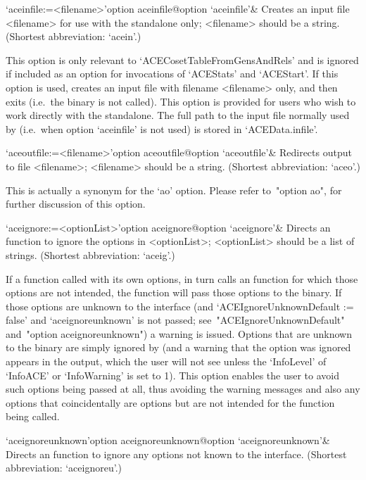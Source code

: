 \>`aceinfile:=<filename>'{option aceinfile}@{option `aceinfile'}&
Creates an {\ACE} input file <filename> for use  with  the  standalone
only; <filename> should be a string. (Shortest abbreviation: `acein'.)

This option is only relevant to `ACECosetTableFromGensAndRels' and  is
ignored if included as an option for  invocations  of  `ACEStats'  and
`ACEStart'. If this option is used, {\GAP} creates an input file  with
filename <filename> only, and then exits (i.e.~the  {\ACE}  binary  is
not called). This option is  provided  for  users  who  wish  to  work
directly with the {\ACE} standalone. The full path to the  input  file
normally used by {\ACE} (i.e.~when option `aceinfile' is not used)  is
stored in `ACEData.infile'.


\>`aceoutfile:=<filename>'{option aceoutfile}@{option `aceoutfile'}&
Redirects {\ACE} output to file <filename>;  <filename>  should  be  a
string. (Shortest abbreviation: `aceo'.)

This  is  actually  a  synonym  for  the  `ao'  option.  Please  refer
to~"option ao", for further discussion of this option.

\>`aceignore:=<optionList>'{option aceignore}@{option `aceignore'}&
Directs an {\ACE} function to  ignore  the  options  in  <optionList>;
<optionList> should be a list of strings.
(Shortest abbreviation: `aceig'.)

If a function called with its own options, in  turn  calls  an  {\ACE}
function for which those options are not intended, the {\ACE} function
will pass those options to the {\ACE} binary.  If  those  options  are
unknown to  the  {\ACE}  interface  (and  `ACEIgnoreUnknownDefault  :=
false'      and      `aceignoreunknown'      is      not       passed;
see~"ACEIgnoreUnknownDefault" and~"option aceignoreunknown") a warning
is issued. Options that are unknown to the {\ACE}  binary  are  simply
ignored by {\ACE} (and a warning that the option was  ignored  appears
in the  {\ACE}  output,  which  the  user  will  not  see  unless  the
`InfoLevel' of `InfoACE' or `InfoWarning' is set to  1).  This  option
enables the user to avoid such  options  being  passed  at  all,  thus
avoiding the warning messages and also any options that coincidentally
are {\ACE} options but are not intended for the {\ACE} function  being
called.

\>`aceignoreunknown'{option aceignoreunknown}@{option `aceignoreunknown'}&
Directs an {\ACE} function to ignore any  options  not  known  to  the
{\ACE} interface.
(Shortest abbreviation: `aceignoreu'.)

